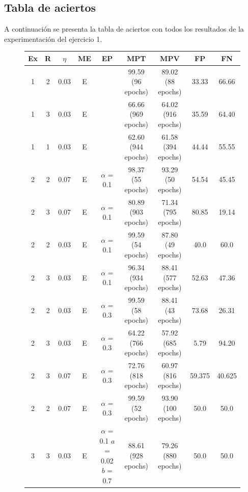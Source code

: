 \subsection{Tabla de aciertos}
A continuación se presenta la tabla de aciertos con todos los resultados de la experimentación del ejercicio 1.
\clearpage
\begin{figure}[H]
\begin{longtable}{ccccccccc}
	\hline
	Ex & R & $\eta$ & ME & EP & MPT & MPV & FP & FN \\
	\hline
	1 & 2 & 0.03 & E  &                                       & 99.59 (96 epochs)  & 89.02 (88 epochs)  & 33.33  & 66.66 \\
	\hline
	1 & 3 & 0.03 & E  &                                       & 66.66 (969 epochs) & 64.02 (916 epochs) & 35.59  & 64.40 \\
	\hline
	1 & 1 & 0.03 & E  &                                       & 62.60 (944 epochs) & 61.58 (394 epochs) & 44.44  & 55.55 \\
	\hline
	\hline
	2 & 2 & 0.07 & E  & $\alpha$ = 0.1                        & 98.37 (55 epochs)  & 93.29 (50 epochs)  & 54.54  & 45.45 \\
	\hline
	2 & 3 & 0.07 & E  & $\alpha$ = 0.1                        & 80.89 (903 epochs) & 71.34 (795 epochs) & 80.85  & 19.14 \\
	\hline
	2 & 2 & 0.03 & E  & $\alpha$ = 0.1                        & 99.59 (54 epochs)  & 87.80 (49 epochs)  & 40.0   & 60.0 \\
	\hline
	2 & 3 & 0.03 & E  & $\alpha$ = 0.1                        & 96.34 (934 epochs) & 88.41 (577 epochs) & 52.63  & 47.36 \\
	\hline
	2 & 2 & 0.03 & E  & $\alpha$ = 0.3                        & 99.59 (58 epochs)  & 88.41 (43 epochs)  & 73.68  & 26.31 \\
	\hline
	2 & 3 & 0.03 & E  & $\alpha$ = 0.3                        & 64.22 (766 epochs) & 57.92 (685 epochs) & 5.79   & 94.20 \\
	\hline
	2 & 3 & 0.07 & E  & $\alpha$ = 0.3                        & 72.76 (818 epochs) & 60.97 (816 epochs) & 59.375 & 40.625 \\
	\hline
	2 & 2 & 0.07 & E  & $\alpha$ = 0.3                        & 99.59 (52 epochs)  & 93.90 (100 epochs) & 50.0   & 50.0 \\
	\hline
	\hline
	3 & 3 & 0.03 & E  & \tcell{$\alpha$ = 0.1\\ $a$ = 0.02\\ $b$ = 0.7} & 88.61 (928 epochs) & 79.26 (880 epochs) & 50.0   & 50.0 \\

\end{longtable}
\end{figure}
